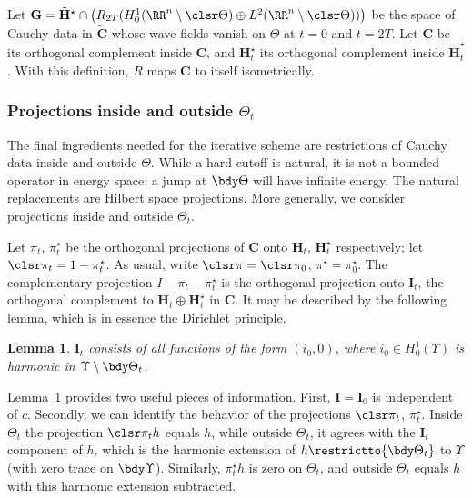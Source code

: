 \documentclass[10pt]{article}
\theoremstyle{plain}
\newtheorem{lemma}[theorem]{Lemma}
\theoremstyle{definition}
\theoremstyle{remark}
\numberwithin{theorem}{section}
\numberwithin{example}{section}
\numberwithin{equation}{section}
\numberwithin{figure}{section}
\begin{document}
Let $\mathbf G=\tilde{\mathbf H}^\star\cap\big( R_{2T}(H^1_0(\RR^n\setminus\clsr\Theta)\oplus L^2(\RR^n\setminus\clsr\Theta))\big)$ be the space of Cauchy data in $\tilde{\mathbf C}$ whose wave fields vanish on $\Theta$ at $t=0$ and $t=2T$. Let $\mathbf C$ be its orthogonal complement inside $\tilde{\mathbf C}$, and ${\mathbf H}_t^\star$ its orthogonal complement inside $\tilde{\mathbf H}_t^\star$. With this definition, $R$ maps $\mathbf C$ to itself isometrically.


\subsubsection{Projections inside and outside $\Theta_t$}			\label{s:projections-setup}


The final ingredients needed for the iterative scheme are restrictions of Cauchy data inside and outside $\Theta$. While a hard cutoff is natural, it is not a bounded operator in energy space: a jump at $\bdy\Theta$ will have infinite energy. The natural replacements are Hilbert space projections. More generally, we consider projections inside and outside $\Theta_t$.

Let $\pi_t$, $\pi_t^\star$ be the orthogonal projections of $\mathbf C$ onto $\mathbf H_t$, $\mathbf H_t^\star$ respectively; let $\clsr\pi_t=1-\pi_t^\star$. As usual, write $\clsr\pi=\clsr\pi_0$, $\pi^\star=\pi_0^\star$. The complementary projection $I-\pi_t-\pi^\star_t$ is the orthogonal projection onto $\mathbf I_t$, the orthogonal complement to $\mathbf H_t \oplus\mathbf H_t^\star$ in $\mathbf C$.
It may be described by the following lemma, which is in essence the Dirichlet principle.
%
%
\begin{lemma}
	$\mathbf I_t$ consists of all functions of the form $(i_0,0)$, where $i_0\in H_0^1(\Upsilon)$ is harmonic in $\Upsilon\setminus\bdy\Theta_t$.
	\label{l:characterization-of-It}
\end{lemma}
%
%
\noindent
Lemma~\ref{l:characterization-of-It} provides two useful pieces of information. First, $\mathbf I=\mathbf I_0$ is independent of $c$. Secondly, we can identify the behavior of the projections $\clsr\pi_t$, $\pi^\star_t$. Inside $\Theta_t$ the projection $\clsr\pi_t h$ equals $h$, while outside $\Theta_t$, it agrees with the $\mathbf I_t$ component of $h$, which is the harmonic extension of $h\restrictto{\bdy\Theta_t}$ to $\Upsilon$ (with zero trace on $\bdy\Upsilon$). Similarly, $\pi^\star_t h$ is zero on $\Theta_t$, and outside $\Theta_t$ equals $h$ with this harmonic extension subtracted.
\end{document}
